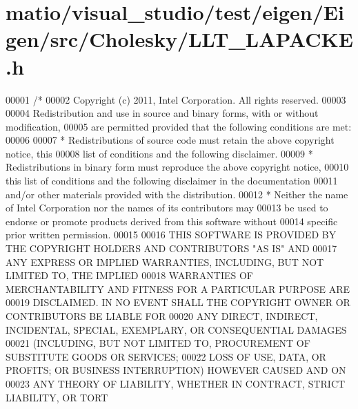 \hypertarget{matio_2visual__studio_2test_2eigen_2_eigen_2src_2_cholesky_2_l_l_t___l_a_p_a_c_k_e_8h_source}{}\section{matio/visual\+\_\+studio/test/eigen/\+Eigen/src/\+Cholesky/\+L\+L\+T\+\_\+\+L\+A\+P\+A\+C\+KE.h}
\label{matio_2visual__studio_2test_2eigen_2_eigen_2src_2_cholesky_2_l_l_t___l_a_p_a_c_k_e_8h_source}

\begin{DoxyCode}
00001 \textcolor{comment}{/*}
00002 \textcolor{comment}{ Copyright (c) 2011, Intel Corporation. All rights reserved.}
00003 \textcolor{comment}{}
00004 \textcolor{comment}{ Redistribution and use in source and binary forms, with or without modification,}
00005 \textcolor{comment}{ are permitted provided that the following conditions are met:}
00006 \textcolor{comment}{}
00007 \textcolor{comment}{ * Redistributions of source code must retain the above copyright notice, this}
00008 \textcolor{comment}{   list of conditions and the following disclaimer.}
00009 \textcolor{comment}{ * Redistributions in binary form must reproduce the above copyright notice,}
00010 \textcolor{comment}{   this list of conditions and the following disclaimer in the documentation}
00011 \textcolor{comment}{   and/or other materials provided with the distribution.}
00012 \textcolor{comment}{ * Neither the name of Intel Corporation nor the names of its contributors may}
00013 \textcolor{comment}{   be used to endorse or promote products derived from this software without}
00014 \textcolor{comment}{   specific prior written permission.}
00015 \textcolor{comment}{}
00016 \textcolor{comment}{ THIS SOFTWARE IS PROVIDED BY THE COPYRIGHT HOLDERS AND CONTRIBUTORS "AS IS" AND}
00017 \textcolor{comment}{ ANY EXPRESS OR IMPLIED WARRANTIES, INCLUDING, BUT NOT LIMITED TO, THE IMPLIED}
00018 \textcolor{comment}{ WARRANTIES OF MERCHANTABILITY AND FITNESS FOR A PARTICULAR PURPOSE ARE}
00019 \textcolor{comment}{ DISCLAIMED. IN NO EVENT SHALL THE COPYRIGHT OWNER OR CONTRIBUTORS BE LIABLE FOR}
00020 \textcolor{comment}{ ANY DIRECT, INDIRECT, INCIDENTAL, SPECIAL, EXEMPLARY, OR CONSEQUENTIAL DAMAGES}
00021 \textcolor{comment}{ (INCLUDING, BUT NOT LIMITED TO, PROCUREMENT OF SUBSTITUTE GOODS OR SERVICES;}
00022 \textcolor{comment}{ LOSS OF USE, DATA, OR PROFITS; OR BUSINESS INTERRUPTION) HOWEVER CAUSED AND ON}
00023 \textcolor{comment}{ ANY THEORY OF LIABILITY, WHETHER IN CONTRACT, STRICT LIABILITY, OR TORT}

\end{DoxyCode}
